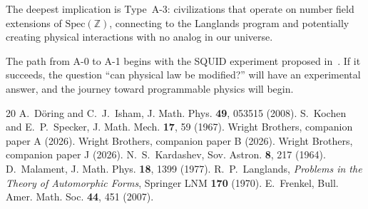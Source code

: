 \documentclass[11pt,a4paper]{article}
\newcommand{\Spec}{\mathrm{Spec}}
\begin{document}
The deepest implication is Type~A-3: civilizations that
operate on number field extensions of $\Spec(\mathbb{Z})$,
connecting to the Langlands program and potentially creating
physical interactions with no analog in our universe.

The path from A-0 to A-1 begins with the SQUID experiment
proposed in~\cite{paper_A}. If it succeeds, the question
``can physical law be modified?'' will have an experimental
answer, and the journey toward programmable physics will begin.

\begin{thebibliography}{20}
 A.~D\"oring and C.~J.~Isham, J. Math. Phys. \textbf{49}, 053515 (2008).
 S.~Kochen and E.~P.~Specker, J. Math. Mech. \textbf{17}, 59 (1967).
 Wright Brothers, companion paper A (2026).
 Wright Brothers, companion paper B (2026).
 Wright Brothers, companion paper J (2026).
 N.~S.~Kardashev, Sov. Astron. \textbf{8}, 217 (1964).
 D.~Malament, J. Math. Phys. \textbf{18}, 1399 (1977).
 R.~P.~Langlands, \emph{Problems in the Theory of Automorphic Forms}, Springer LNM \textbf{170} (1970).
 E.~Frenkel, Bull. Amer. Math. Soc. \textbf{44}, 451 (2007).
\end{thebibliography}
\end{document}
